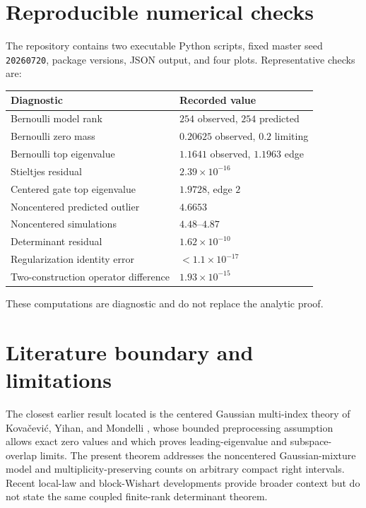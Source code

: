 \documentclass[
  aps,
  prl,
  10pt,
  onecolumn,
  longbibliography,
  nofootinbib
]{revtex4-2}
\theoremstyle{remark}
\begin{document}
\section{Reproducible numerical checks}

The repository contains two executable Python scripts, fixed master seed
\texttt{20260720}, package versions, JSON output, and four plots. Representative checks are:
\begin{center}
\begin{tabular}{@{}ll@{}}
\toprule
Diagnostic & Recorded value\\
\midrule
Bernoulli model rank & $254$ observed, $254$ predicted\\
Bernoulli zero mass & $0.20625$ observed, $0.2$ limiting\\
Bernoulli top eigenvalue & $1.1641$ observed, $1.1963$ edge\\
Stieltjes residual & $2.39\times10^{-16}$\\
Centered gate top eigenvalue & $1.9728$, edge $2$\\
Noncentered predicted outlier & $4.6653$\\
Noncentered simulations & $4.48$--$4.87$\\
Determinant residual & $1.62\times10^{-10}$\\
Regularization identity error & $<1.1\times10^{-17}$\\
Two-construction operator difference & $1.93\times10^{-15}$\\
\bottomrule
\end{tabular}
\end{center}
These computations are diagnostic and do not replace the analytic proof.

\section{Literature boundary and limitations}

The closest earlier result located is the centered Gaussian multi-index theory of Kova\v{c}evi\'c, Yihan, and Mondelli \cite{KovacevicEtAl2025}, whose bounded preprocessing assumption allows exact zero values and which proves leading-eigenvalue and subspace-overlap limits. The present theorem addresses the noncentered Gaussian-mixture model and multiplicity-preserving counts on arbitrary compact right intervals. Recent local-law and block-Wishart developments \cite{FanEtAl2026,MontanariSaeed2026} provide broader context but do not state the same coupled finite-rank determinant theorem.
\end{document}
